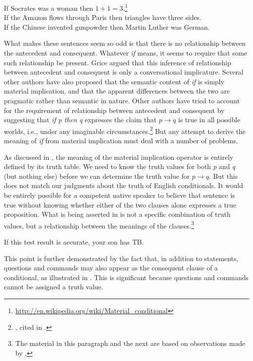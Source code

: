 \ea \label{ex:19.21}
\ea  If Socrates was a woman then $1+1=3$.\footnote{\url{http://en.wikipedia.org/wiki/Material_conditional}} \\
\ex If the Amazon flows through Paris then triangles have three sides.\\
\ex If the  {Chinese} invented gunpowder then Martin Luther was  {German}.
                       \z
\z


What makes these sentences seem so odd is that there is no relationship between the antecedent and consequent. Whatever \textit{if} means, it seems to require that some such relationship be present. Grice argued that this inference of relationship between antecedent and consequent is only a conversational implicature. Several other authors have also proposed that the semantic content of \textit{if} is simply material implication, and that the apparent differences between the two are pragmatic rather than semantic in nature. Other authors have tried to account for the requirement of relationship between antecedent and consequent by suggesting that \textit{if p then q} expresses the claim that $p\rightarrow q$ is true in all possible worlds, i.e., under any imaginable circumstances.\footnote{\citet{Lewis1918}, cited in \citet{vonFintel2011}.} But any attempt to derive the meaning of \textit{if} from material implication must deal with a number of problems.



As discussed in , the meaning of the material implication operator is entirely defined by its truth table. We need to know the truth values for both \textit{p} and \textit{q} (but nothing else) before we can determine the truth value for $p\rightarrow q$. But this does not match our judgments about the truth of English conditionals. It would be entirely possible for a competent native speaker to believe that sentence  is true without knowing whether either of the two clauses alone expresses a true proposition. What is being asserted in  is not a specific combination of truth values, but a relationship between the meanings of the clauses.\footnote{The material in this paragraph and the next are based on observations made by \citet{Podlesskaya2001}.}


\ea \label{ex:19.22}
If this test result is accurate, your son has TB.
\z


This point is further demonstrated by the fact that, in addition to statements, questions and commands may also appear as the consequent clause of a conditional, as illustrated in . This is significant because questions and commands cannot be assigned a truth value.


